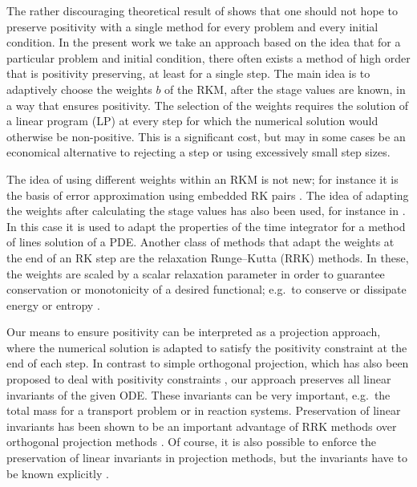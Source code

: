 \documentclass[a4paper]{article}
\numberwithin{equation}{section}
\theoremstyle{plain}
\theoremstyle{definition}
\numberwithin{theorem}{section}
\newcommand{\1}{\mathbbm{1}}
\begin{document}
The rather discouraging theoretical result of \cite{bolley_conservation_1978} shows that one
should not hope to preserve positivity with a single method for every problem and every
initial condition.  In the present work we take an approach based on the idea that for
a particular problem and initial condition, there often exists a method of high order
that is positivity preserving, at least for a single step.
The main idea is to adaptively choose the weights $b$ of the RKM, after
the stage values are known, in a way that ensures positivity.
The selection of the weights requires the solution of a linear program (LP) at every
step for which the numerical solution would otherwise be non-positive.
This is a significant cost, but may in some cases be an economical alternative to rejecting
a step or using excessively small step sizes.

The idea of using different weights within an RKM is not new; for instance it is
the basis of error approximation using embedded RK pairs \cite{hairer_solving_1993}.
The idea of adapting the weights after calculating the stage values has also been used,
for instance in \cite{ketcheson_spatially_2013}.  In this case it is used to
adapt the properties of the time integrator for a method of lines solution of a
PDE.  Another class of methods that adapt the weights at the end of an RK step
are the relaxation Runge--Kutta (RRK) methods.  In these, the weights are
scaled by a scalar relaxation parameter in order to guarantee conservation or
monotonicity of a desired functional; e.g.\ to conserve or dissipate energy or
entropy
\cite{ketcheson_relaxation_2019,ranocha_relaxation_2019,ranocha2020general}.

Our means to ensure positivity can be interpreted as a projection
approach, where the numerical solution is adapted to satisfy the
positivity constraint at the end of each step. In contrast to
simple orthogonal projection, which has also been proposed to deal
with positivity constraints \cite{shampine1986conservation},
our approach preserves all linear invariants of the given ODE. These
invariants can be very important, e.g.\ the total mass for a transport
problem or in reaction systems. Preservation of linear
invariants has been shown to be an important advantage of RRK methods
over orthogonal projection methods
\cite{ranocha2020relaxationHamiltonian}. Of course, it is also
possible to enforce the preservation of linear invariants in projection
methods, but the invariants have to be known explicitly
\cite{sandu2001positive}.
\end{document}
